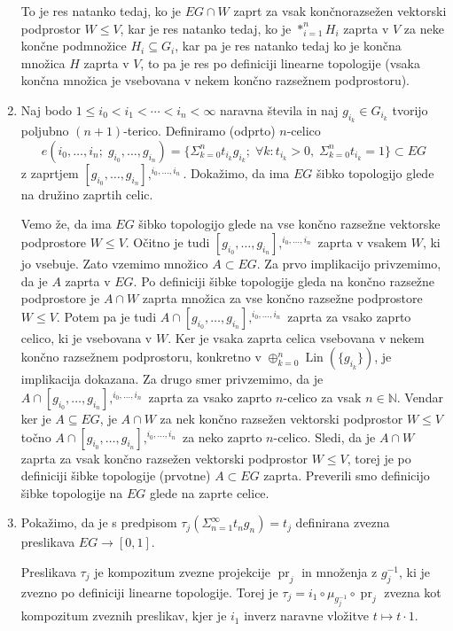 \documentclass[a4paper, 12pt]{article}
\DeclareMathOperator{\Lin}{Lin}
\DeclareMathOperator{\pr}{pr}
\newcommand{\N}{\mathbb{N}}
\begin{document}
\begin{enumerate}[label=(\alph*)]
	To je res natanko tedaj, ko je $EG \cap W$ zaprt za vsak končnorazsežen vektorski podprostor $W \leq V$, kar je res natanko tedaj, ko je $*_{i = 1}^nH_i$ zaprta v $V$ za neke končne podmnožice $H_i \subseteq G_i$, kar pa je res natanko tedaj ko je končna množica $H$ zaprta v $V$, to pa je res po definiciji linearne topologije (vsaka končna množica je vsebovana v nekem končno razsežnem podprostoru).
	
	\item Naj bodo $1 \leq i_0 < i_1 < \cdots < i_n < \infty$ naravna števila in naj $g_{i_k} \in G_{i_k}$ tvorijo poljubno $(n+1)$-terico. Definiramo (odprto) $n$-celico
	\[
	e(i_0, \dots, i_n ; \; g_{i_0}, \dots, g_{i_n}) = \lbrace \Sigma_{k = 0}^n t_{i_k}g_{i_k}; \; \forall k: t_{i_k} > 0, \; \Sigma_{k = 0}^nt_{i_k} = 1 \rbrace \subset EG
	\]
	z zaprtjem $[g_{i_0}, \dots, g_{i_n}],^{i_0, \dots, i_n}$. Dokažimo, da ima $EG$ šibko topologijo glede na družino zaprtih celic.
	
	Vemo že, da ima $EG$ šibko topologijo glede na vse končno razsežne vektorske podprostore $W \leq V$. Očitno je tudi $[g_{i_0}, \dots, g_{i_n}],^{i_0, \dots, i_n}$ zaprta v vsakem $W$, ki jo vsebuje. Zato vzemimo množico $A \subset EG$.
	Za prvo implikacijo privzemimo, da je $A$ zaprta v $EG$. Po definiciji šibke topologije gleda na končno razsežne podprostore je $A \cap W$ zaprta množica za vse končno razsežne podprostore $W \leq V$. Potem pa je tudi $A \cap [g_{i_0}, \dots, g_{i_n}],^{i_0, \dots, i_n}$ zaprta za vsako zaprto celico, ki je vsebovana v $W$. Ker je vsaka zaprta celica vsebovana v nekem končno razsežnem podprostoru, konkretno v $\oplus_{k=0}^n\Lin(\lbrace g_{i_k} \rbrace)$, je implikacija dokazana.
	Za drugo smer privzemimo, da je $A \cap [g_{i_0}, \dots, g_{i_n}],^{i_0, \dots, i_n}$ zaprta za vsako zaprto $n$-celico za vsak $n \in \N$. Vendar ker je $A \subseteq EG$, je $A \cap W$ za nek končno razsežen vektorski podprostor $W \leq V$ točno $A \cap [g_{i_0}, \dots, g_{i_n}],^{i_0, \dots, i_n}$ za neko zaprto $n$-celico. Sledi, da je $A\cap W$ zaprta za vsak končno razsežen vektorski podprostor $W \leq V$, torej je po definiciji šibke topologije (prvotne) $A \subset EG$ zaprta.
	Preverili smo definicijo šibke topologije na $EG$ glede na zaprte celice.
	
	\item Pokažimo, da je s predpisom $\tau_j(\Sigma_{n = 1}^\infty t_ng_n) = t_j$ definirana zvezna preslikava $EG \to [0, 1]$.
	
	Preslikava $\tau_j$ je kompozitum zvezne projekcije $\pr_j$ in množenja z $g_j^{-1}$, ki je zvezno po definiciji linearne topologije. Torej je $\tau_j =i_1 \circ \mu_{g_j^{-1}}\circ\pr_j$ zvezna kot kompozitum zveznih preslikav, kjer je $i_1$ inverz naravne vložitve $t \mapsto t\cdot 1$.
	

\end{enumerate}
\end{document}
